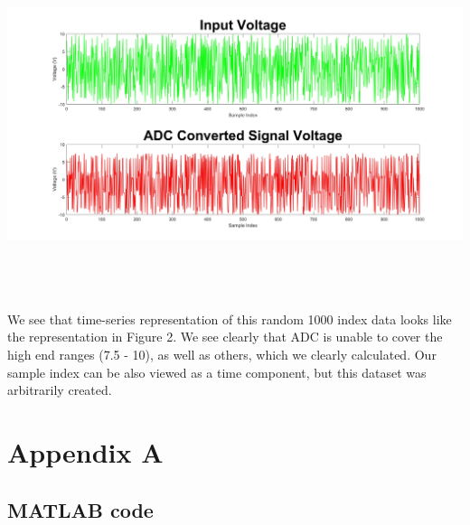 \documentclass[12pt, a4paper]{article}
\begin{document}
\begin{enumerate}
\begin{minipage}[t]{\linewidth}
\centering
\includegraphics[width=1\textwidth]{hw21}
\end{minipage} \\ \\ \\
We see that time-series representation of this random 1000 index data looks like the representation in Figure 2. We see clearly that ADC is unable to cover the high end ranges (7.5 - 10), as well as others, which we clearly calculated. Our sample index can be also viewed as a time component, but this dataset was arbitrarily created.

%
%

\end{enumerate}
\pagebreak
\section*{\fontsize{19}{15}\selectfont Appendix A}
\subsection*{MATLAB code}

\end{document}

